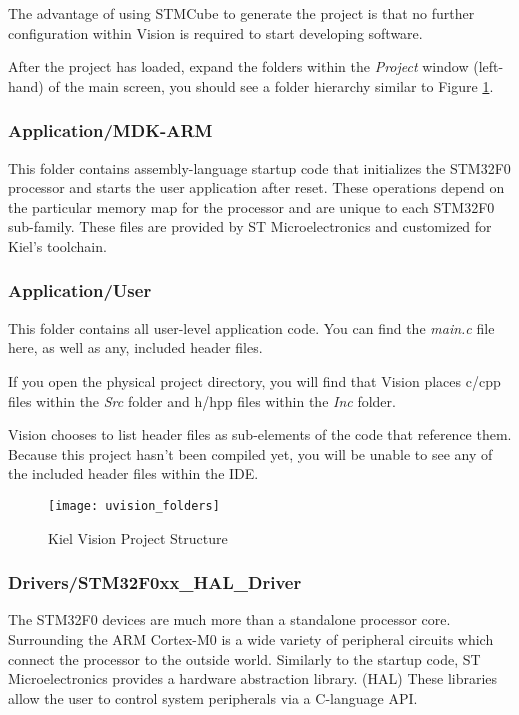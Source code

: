 \documentclass[openany,11pt,fleqn]{book} %
\begin{document}
The advantage of using STMCube to generate the project is that no further configuration within {\textmu}Vision is required to start developing software. 

After the project has loaded, expand the folders within the \textit{Project} window (left-hand) of the main screen, you should see a folder hierarchy similar to Figure \ref{uvision_folders}.

\subsubsection*{Application/MDK-ARM}
This folder contains assembly-language startup code that initializes the STM32F0 processor and starts the user application after reset.  These operations depend on the particular memory map for the processor and are unique to each STM32F0 sub-family. These files are provided by ST Microelectronics and customized for Kiel's toolchain. 

\subsubsection*{Application/User}
This folder contains all user-level application code. You can find the \textit{main.c} file here, as well as any, included header files. 

If you open the physical project directory, you will find that {\textmu}Vision places c/cpp files within the \textit{Src} folder and h/hpp files within the \textit{Inc} folder. 
 
\begin{warning}
	{\textmu}Vision chooses to list header files as sub-elements of the code that reference them. Because this project hasn't been compiled yet, you will be unable to see any of the included header files within the IDE.
\end{warning}

\begin{figure}[h!]
	\centering\texttt{[image: uvision\_folders]}
	\caption{Kiel {\textmu}Vision Project Structure}
	\label{uvision_folders}
\end{figure}

\subsubsection*{Drivers/STM32F0xx\_HAL\_Driver}
The STM32F0 devices are much more than a standalone processor core. Surrounding the ARM Cortex-M0 is a wide variety of peripheral circuits which connect the processor to the outside world. Similarly to the startup code, ST Microelectronics provides a hardware abstraction library. (HAL) These libraries allow the user to control system peripherals via a C-language API. %
\end{document}
